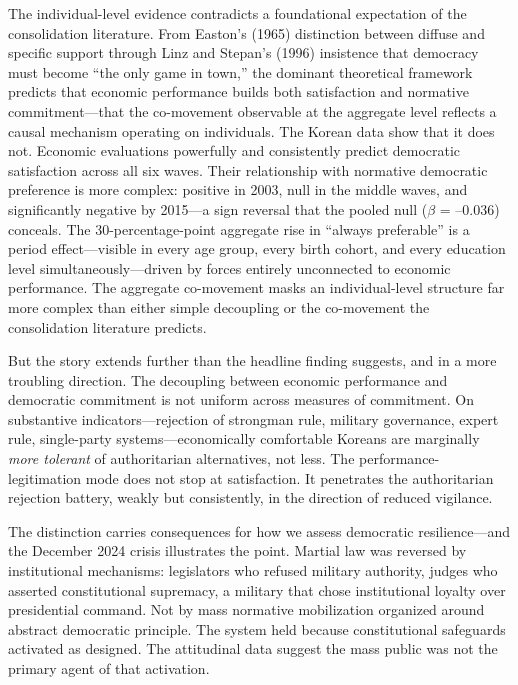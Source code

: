 \documentclass[
  12pt,
  12pt,
  letterpaper]{article}
\begin{document}
The individual-level evidence contradicts a foundational expectation of
the consolidation literature. From Easton's (1965) distinction between
diffuse and specific support through Linz and Stepan's (1996) insistence
that democracy must become ``the only game in town,'' the dominant
theoretical framework predicts that economic performance builds both
satisfaction and normative commitment---that the co-movement observable
at the aggregate level reflects a causal mechanism operating on
individuals. The Korean data show that it does not. Economic evaluations
powerfully and consistently predict democratic satisfaction across all
six waves. Their relationship with normative democratic preference is
more complex: positive in 2003, null in the middle waves, and
significantly negative by 2015---a sign reversal that the pooled null
(\(\beta\) = --0.036) conceals. The 30-percentage-point aggregate rise
in ``always preferable'' is a period effect---visible in every age
group, every birth cohort, and every education level
simultaneously---driven by forces entirely unconnected to economic
performance. The aggregate co-movement masks an individual-level
structure far more complex than either simple decoupling or the
co-movement the consolidation literature predicts.

But the story extends further than the headline finding suggests, and in
a more troubling direction. The decoupling between economic performance
and democratic commitment is not uniform across measures of commitment.
On substantive indicators---rejection of strongman rule, military
governance, expert rule, single-party systems---economically comfortable
Koreans are marginally \emph{more tolerant} of authoritarian
alternatives, not less. The performance-legitimation mode does not stop
at satisfaction. It penetrates the authoritarian rejection battery,
weakly but consistently, in the direction of reduced vigilance.

The distinction carries consequences for how we assess democratic
resilience---and the December 2024 crisis illustrates the point. Martial
law was reversed by institutional mechanisms: legislators who refused
military authority, judges who asserted constitutional supremacy, a
military that chose institutional loyalty over presidential command. Not
by mass normative mobilization organized around abstract democratic
principle. The system held because constitutional safeguards activated
as designed. The attitudinal data suggest the mass public was not the
primary agent of that activation.
\end{document}
